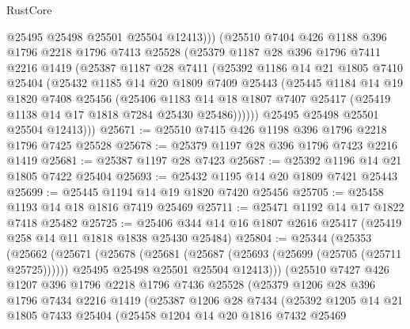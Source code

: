 \begin{lexlean}{RustCore}
\begin{coremodule}
            @25495
            @25498
            @25501
            @25504
            @12413)))
      (@25510
        @7404
        @426
        @1188
        @396
        @1796
        @2218
        @1796
        @7413
        @25528
        (@25379
          @1187
          @28
          @396
          @1796
          @7411
          @2216
          @1419
          (@25387
            @1187
            @28
            @7411
            (@25392
              @1186
              @14
              @21
              @1805
              @7410
              @25404
              (@25432
                @1185
                @14
                @20
                @1809
                @7409
                @25443
                (@25445
                  @1184
                  @14
                  @19
                  @1820
                  @7408
                  @25456
                  (@25406
                    @1183
                    @14
                    @18
                    @1807
                    @7407
                    @25417
                    (@25419 @1138 @14 @17 @1818 @7284 @25430 @25486))))))
          @25495
          @25498
          @25501
          @25504
          @12413)))
@25671 := @25510 @7415 @426 @1198 @396 @1796 @2218 @1796 @7425 @25528
@25678 := @25379 @1197 @28 @396 @1796 @7423 @2216 @1419
@25681 := @25387 @1197 @28 @7423
@25687 := @25392 @1196 @14 @21 @1805 @7422 @25404
@25693 := @25432 @1195 @14 @20 @1809 @7421 @25443
@25699 := @25445 @1194 @14 @19 @1820 @7420 @25456
@25705 := @25458 @1193 @14 @18 @1816 @7419 @25469
@25711 := @25471 @1192 @14 @17 @1822 @7418 @25482
@25725 := @25406 @344 @14 @16 @1807 @2616 @25417 (@25419 @258 @14 @11 @1818 @1838 @25430 @25484)
@25804 := @25344
    (@25353
      (@25662
        (@25671
          (@25678
            (@25681 (@25687 (@25693 (@25699 (@25705 (@25711 @25725))))))
            @25495
            @25498
            @25501
            @25504
            @12413)))
      (@25510
        @7427
        @426
        @1207
        @396
        @1796
        @2218
        @1796
        @7436
        @25528
        (@25379
          @1206
          @28
          @396
          @1796
          @7434
          @2216
          @1419
          (@25387
            @1206
            @28
            @7434
            (@25392
              @1205
              @14
              @21
              @1805
              @7433
              @25404
              (@25458
                @1204
                @14
                @20
                @1816
                @7432
                @25469

\end{coremodule}
\end{lexlean}
